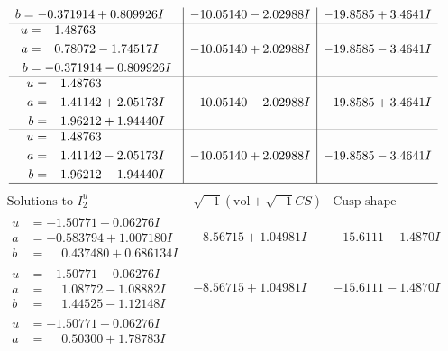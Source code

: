 \documentclass[1p]{elsarticle_modified}
\theoremstyle{definition}
\newcommand{\I}{\sqrt{-1}}
\begin{document}
$$\begin{array}{c|c|c}
\begin{aligned}
b &= -0.371914 + 0.809926 I\end{aligned}
 & -10.05140 - 2.02988 I & -19.8585 + 3.4641 I \\ \hline\begin{aligned}
u &= \phantom{-}1.48763\phantom{ +0.000000I} \\
a &= \phantom{-}0.78072 - 1.74517 I \\
b &= -0.371914 - 0.809926 I\end{aligned}
 & -10.05140 + 2.02988 I & -19.8585 - 3.4641 I \\ \hline\begin{aligned}
u &= \phantom{-}1.48763\phantom{ +0.000000I} \\
a &= \phantom{-}1.41142 + 2.05173 I \\
b &= \phantom{-}1.96212 + 1.94440 I\end{aligned}
 & -10.05140 - 2.02988 I & -19.8585 + 3.4641 I \\ \hline\begin{aligned}
u &= \phantom{-}1.48763\phantom{ +0.000000I} \\
a &= \phantom{-}1.41142 - 2.05173 I \\
b &= \phantom{-}1.96212 - 1.94440 I\end{aligned}
 & -10.05140 + 2.02988 I & -19.8585 - 3.4641 I\\
 \hline 
 \end{array}$$\newpage$$\begin{array}{c|c|c}  
\text{Solutions to }I^u_{2}& \I (\text{vol} + \sqrt{-1}CS) & \text{Cusp shape}\\
 \hline 
\begin{aligned}
u &= -1.50771 + 0.06276 I \\
a &= -0.583794 + 1.007180 I \\
b &= \phantom{-}0.437480 + 0.686134 I\end{aligned}
 & -8.56715 + 1.04981 I & -15.6111 - 1.4870 I \\ \hline\begin{aligned}
u &= -1.50771 + 0.06276 I \\
a &= \phantom{-}1.08772 - 1.08882 I \\
b &= \phantom{-}1.44525 - 1.12148 I\end{aligned}
 & -8.56715 + 1.04981 I & -15.6111 - 1.4870 I \\ \hline\begin{aligned}
u &= -1.50771 + 0.06276 I \\
a &= \phantom{-}0.50300 + 1.78783 I \\

\end{aligned}
\end{array}$$
\end{document}
